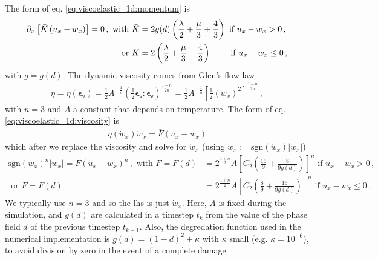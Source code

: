 \documentclass[11pt,a4paper]{article}
\newcommand{\p}{\partial}
\newcommand{\bb}[1]{\boldsymbol{#1}}
\newcommand{\varv}{\mathsf{v}}
\begin{document}
The form of eq. \eqref{eq:viscoelastic_1d:momentum} is
\begin{align}
    \p_x \left[ \bar{K} \left(u_x - w_x\right) \right] = 0
    \,,
    \label{eq:viscoelastic_1d:momentum:form}
    \text{ with }
    \bar{K} 
    &
    = 2 g(d) \left(\frac{\lambda}{2} + \frac{\mu}{3} + \frac{4}{3} \right) 
    \text{ if } u_x-w_x >0
    \,,
    \\
    \text{ or }
    \bar{K} 
    &
    = 2 \left(\frac{\lambda}{2} + \frac{\mu}{3} + \frac{4}{3} \right)
    \hspace{0.7cm}
    \text{ if }
    u_x-w_x \leq 0
    \,,
    \nonumber
\end{align}
with $g=g(d)$. The dynamic viscosity comes from Glen's flow law
\begin{align}
    \eta = \eta(\dot{\bb{\epsilon}}_\varv) 
    = 
    \frac{1}{2} A^{-\frac{1}{n}} 
    \left(\frac{1}{2} \dot{\bb{\epsilon}}_\varv : \dot{\bb{\epsilon}}_\varv \right)^{\frac{1-n}{2n}}
    =
    \frac{1}{2} A^{-\frac{1}{n}} 
    \left[\frac{1}{2} (\dot{w}_x)^2 \right]^{\frac{1-n}{2n}}
    \,,
    \label{eq:viscoelastic_1d:Glen}
\end{align}
with $n=3$ and $A$ a constant that depends on temperature. The form of eq. \eqref{eq:viscoelastic_1d:viscosity} is 
\begin{align*}
    \eta(\dot{w}_x) \dot{w}_x = \bar{F} (u_x-w_x)
\end{align*}
which after we replace the viscosity and solve for $\dot{w}_x$ (using $\dot{w}_x := \text{sgn}(\dot{w}_x) |\dot{w}_x|$)
\begin{align}
    \text{sgn}(\dot{w}_x)^n |\dot{w}_x| 
    = F \left(u_x - w_x \right)^n
    \,,
    \label{eq:viscoelastic_1d:viscosity:form}
    \text{ with }
    F = F(d)
    &
    = 2^{\frac{1+n}{2}} A 
    \left[C_2(\frac{16}{9} + \frac{8}{9 g(d)})\right]^n
    \text{ if } u_x - w_x >0
    \,,
    \\
    \text{ or }
    F =F(d)
    &
    = 2^{\frac{1+n}{2}} A 
    \left[C_2(\frac{8}{9} + \frac{16}{9 g(d)})\right]^n
    \text{ if } u_x - w_x \leq 0
    \,.
    \nonumber
\end{align}
We typically use $n=3$ and so the lhs is just $\dot{w}_x$. Here, $A$ is fixed during the simulation, and $g(d)$ are calculated in a timestep $t_k$ from the value of the phase field $d$ of the previous timestep $t_{k-1}$. Also, the degredation function used in the numerical implementation is $g(d) = (1-d)^2 + \kappa$ with $\kappa$ small (e.g. $\kappa = 10^{-6}$), to avoid division by zero in the event of a complete damage.
\end{document}
